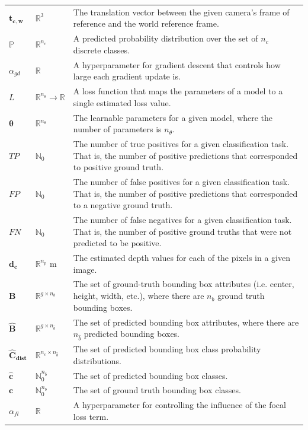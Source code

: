 \documentclass[12pt]{article}
\begin{document}
\begin{longtable*}{l l p{12cm}}
\\
$\mathbf{t_{c,w}}$ & $\mathbb{R}^{3}$ & The translation vector between the given camera's frame of reference and the world reference frame.
\\
$\mathbb{P}$ & $\mathbb{R}^{n_c}$ & A predicted probability distribution over the set of $n_c$ discrete classes.
\\
$\alpha_{gd}$ & $\mathbb{R}$ & A hyperparameter for gradient descent that controls how large each gradient update is.
\\
$L$ & $\mathbb{R}^{n_\theta}\rightarrow\mathbb{R}$ & A loss function that maps the parameters of a model to a single estimated loss value.
\\
$\mathbf{\theta}$ & $\mathbb{R}^{n_\theta}$ & The learnable parameters for a given model, where the number of parameters is $n_\theta$.
\\
$TP$ & $\mathbb{N}_{0}$ & The number of true positives for a given classification task. That is, the number of positive predictions that corresponded to positive ground truth.
\\
$FP$ & $\mathbb{N}_{0}$ & The number of false positives for a given classification task. That is, the number of positive predictions that corresponded to a negative ground truth.
\\
$FN$ & $\mathbb{N}_{0}$ & The number of false negatives for a given classification task. That is, the number of positive ground truths that were not predicted to be positive.
\\
$\mathbf{d_{c}}$ & $\mathbb{R}^{n_p}$ m & The estimated depth values for each of the pixels in a given image.
\\
$\mathbf{B}$ & $\mathbb{R}^{g\times{}n_b}$ & The set of ground-truth bounding box attributes (i.e. center, height, width, etc.), where there are $n_b$ ground truth bounding boxes.
\\
$\mathbf{\hat{B}}$ & $\mathbb{R}^{g\times{}n_{\hat{b}}}$ & The set of predicted bounding box attributes, where there are $n_{\hat{b}}$ predicted bounding boxes.
\\
$\mathbf{\hat{C}_{\text{dist}}}$ & $\mathbb{R}^{n_c\times{}n_{\hat{b}}}$ & The set of predicted bounding box class probability distributions.
\\
$\mathbf{\hat{c}}$ & $\mathbb{N}_{0}^{n_{\hat{b}}}$ & The set of predicted bounding box classes.
\\
$\mathbf{c}$ & $\mathbb{N}_{0}^{n_b}$ & The set of ground truth bounding box classes.
\\
$\alpha_{fl}$ & $\mathbb{R}$ & A hyperparameter for controlling the influence of the focal loss term.

\end{longtable*}
\end{document}
